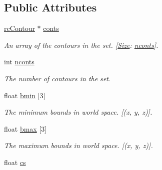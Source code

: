 \subsection*{Public Attributes}
\begin{DoxyCompactItemize}
\item 
\mbox{\label{structrcContourSet_a3bcaf837897d6d239b7a9c8cfbbcf836}} 
\hyperlink{structrcContour}{rc\+Contour} $\ast$ \hyperlink{structrcContourSet_a3bcaf837897d6d239b7a9c8cfbbcf836}{conts}
\begin{DoxyCompactList}\small\item\em An array of the contours in the set. \mbox{[}\hyperlink{classSize}{Size}\+: \hyperlink{structrcContourSet_aa751e5adb077b2ea7a9c8795e7a2fa99}{nconts}\mbox{]}. \end{DoxyCompactList}\item 
\mbox{\label{structrcContourSet_aa751e5adb077b2ea7a9c8795e7a2fa99}} 
int \hyperlink{structrcContourSet_aa751e5adb077b2ea7a9c8795e7a2fa99}{nconts}
\begin{DoxyCompactList}\small\item\em The number of contours in the set. \end{DoxyCompactList}\item 
\mbox{\label{structrcContourSet_a1d479ca636b7585669457c3d8b04a2bb}} 
float \hyperlink{structrcContourSet_a1d479ca636b7585669457c3d8b04a2bb}{bmin} \mbox{[}3\mbox{]}
\begin{DoxyCompactList}\small\item\em The minimum bounds in world space. \mbox{[}(x, y, z)\mbox{]}. \end{DoxyCompactList}\item 
\mbox{\label{structrcContourSet_a9df9f697faef45212462b8a102181f5e}} 
float \hyperlink{structrcContourSet_a9df9f697faef45212462b8a102181f5e}{bmax} \mbox{[}3\mbox{]}
\begin{DoxyCompactList}\small\item\em The maximum bounds in world space. \mbox{[}(x, y, z)\mbox{]}. \end{DoxyCompactList}\item 
\mbox{\label{structrcContourSet_a1dbf04db7e828a3757e951e4f8499c95}} 
float \hyperlink{structrcContourSet_a1dbf04db7e828a3757e951e4f8499c95}{cs}

\end{DoxyCompactItemize}
